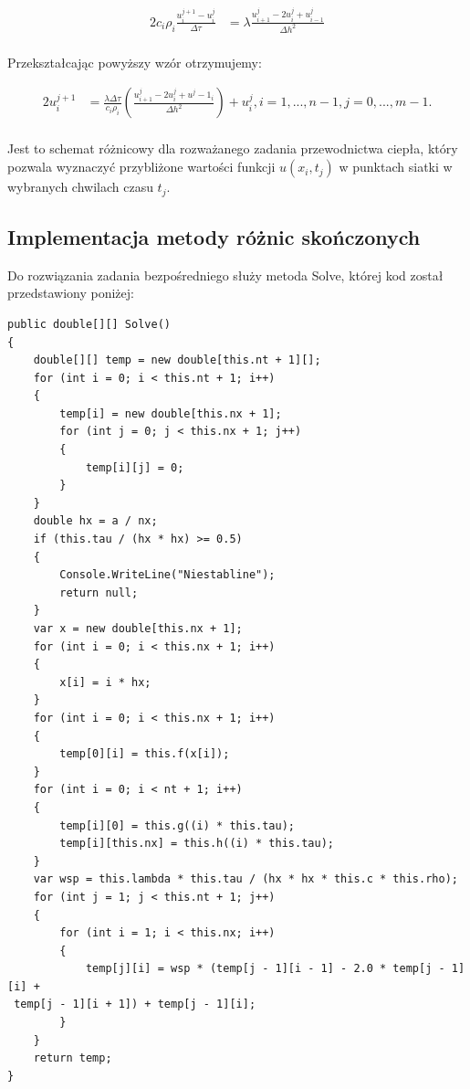 \documentclass[twoside]{projektInzynierskiMS1}
\newcommand{\si}{ś}
\begin{document}
\begin{alignat*}{2}
c_i \rho _i \frac{ u^{j+1}_i - u^j_i}{ \Delta \tau}&= \lambda \frac{ u^j_{i+1} - 2u^j_i+u^j_{i-1}}{\Delta h^2}\\
\end{alignat*}

Przekształcając powyższy wzór otrzymujemy:

\begin{alignat*}{2}
 u^{j+1}_i&= \frac{\lambda \Delta \tau}{c_i \rho _i} \left( \frac{u^j_{i+1} - 2u^j_i+u^j-1_i}{\Delta h^2} \right) + u^j_i, i=1, ..., n-1, j =0, ..., m-1.\\
\end{alignat*}

Jest to schemat różnicowy dla rozważanego zadania przewodnictwa ciepła, który pozwala wyznaczyć przybliżone warto\si ci funkcji $u(x_i, t_j)$ w punktach siatki w wybranych chwilach czasu $t_j$.

\subsection{Implementacja metody różnic skończonych}

Do rozwiązania zadania bezpośredniego służy metoda Solve, której kod został przedstawiony poniżej:

\begin{verbatim}
public double[][] Solve()
{
    double[][] temp = new double[this.nt + 1][];
    for (int i = 0; i < this.nt + 1; i++)
    {
        temp[i] = new double[this.nx + 1];
        for (int j = 0; j < this.nx + 1; j++)
        {
            temp[i][j] = 0;
        }
    }
    double hx = a / nx;
    if (this.tau / (hx * hx) >= 0.5)
    {
        Console.WriteLine("Niestabline");
        return null;
    }
    var x = new double[this.nx + 1];
    for (int i = 0; i < this.nx + 1; i++)
    {
        x[i] = i * hx;
    }
    for (int i = 0; i < this.nx + 1; i++)
    {
        temp[0][i] = this.f(x[i]);
    }
    for (int i = 0; i < nt + 1; i++)
    {
        temp[i][0] = this.g((i) * this.tau);
        temp[i][this.nx] = this.h((i) * this.tau);
    }
    var wsp = this.lambda * this.tau / (hx * hx * this.c * this.rho);
    for (int j = 1; j < this.nt + 1; j++)
    {
        for (int i = 1; i < this.nx; i++)
        {
            temp[j][i] = wsp * (temp[j - 1][i - 1] - 2.0 * temp[j - 1][i] +
 temp[j - 1][i + 1]) + temp[j - 1][i];
        }
    }
    return temp;
}   
\end{verbatim}
\end{document}

